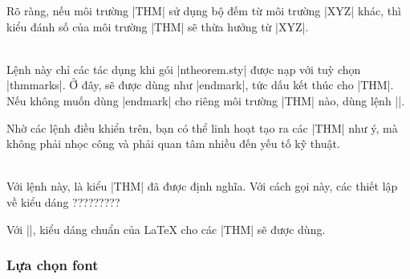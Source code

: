 \begin{description}
	Rõ ràng, nếu môi trường |THM| sử dụng bộ đếm từ môi trường |XYZ| khác,
	thì kiểu đánh số của môi trường |THM| sẽ thừa hưởng từ |XYZ|.
\item
\DescribeMacro\theoremsymbol
  \\
	Lệnh này chỉ các tác dụng khi gói |ntheorem.sty| được nạp với tuỳ chọn |thmmarks|.
	Ở đây,  sẽ được dùng như |endmark|, tức dấu kết thúc cho |THM|.
	Nếu không muốn dùng |endmark| cho riêng môi trường |THM| nào, 
	dùng lệnh |\theoremsymbol{}|.
\end{description}

Nhờ các lệnh điều khiển trên, bạn có thể linh hoạt tạo ra các |THM| như ý,
mà không phải nhọc công và phải quan tâm nhiều đến yếu tố kỹ thuật.

\medskip
\DescribeMacro\theoremclass{}\\
Với lệnh này,  là kiểu |THM| đã được định nghĩa.
Với cách gọi này, các thiết lập về kiểu dáng ?????????

Với ||, kiểu dáng chuẩn của \LaTeX{} cho các |THM|
sẽ được dùng.

\subsubsection{Lựa chọn font}

